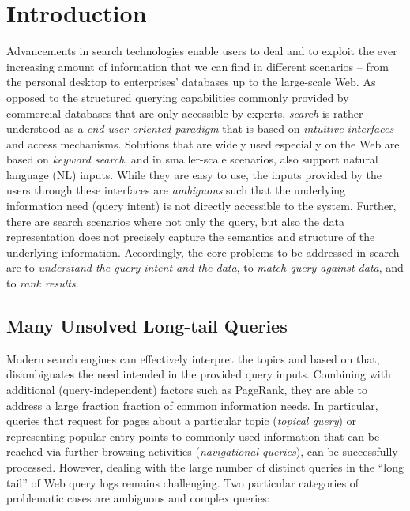 \section{Introduction}
Advancements in search technologies enable users to deal and to exploit the ever increasing amount of information that we can find in different scenarios -- from the personal desktop to enterprises' databases up to the large-scale Web. As opposed to the structured querying capabilities commonly provided by commercial databases that are only accessible by experts, \emph{search} is rather understood as a \emph{end-user oriented paradigm} that is based on \emph{intuitive interfaces} and access mechanisms. Solutions that are widely used especially on the Web are based on \emph{keyword search}, and in smaller-scale scenarios, also support natural language (NL) inputs. While they are easy to use, the inputs provided by the users through these interfaces are \emph{ambiguous} such that the underlying information need (query intent) is not directly accessible to the system. Further, there are search scenarios where not only the query, but also the data representation does not precisely capture the semantics and structure of the underlying information. Accordingly, the core problems to be addressed in search are to \emph{understand the query intent and the data}, to \emph{match query against data}, and to \emph{rank results}. 

\subsection{Many Unsolved Long-tail Queries}
Modern search engines can effectively interpret the topics and based on that, disambiguates the need intended in the provided query inputs. Combining with additional (query-independent) factors such as PageRank, they are able to address a large fraction fraction of common information needs. In particular, queries that request for pages about a particular topic (\emph{topical query}) or representing popular entry points to commonly used information that can be reached via further browsing activities (\emph{navigational queries}), can be successfully processed. However, dealing with the large number of distinct queries in the ``long tail'' of Web query logs \cite{} remains challenging. Two particular categories of problematic cases are ambiguous and complex queries:


